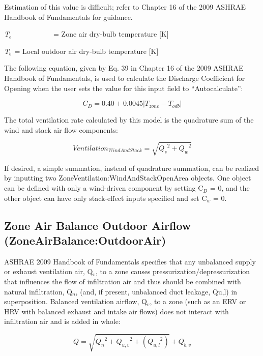 Estimation of this value is difficult; refer to Chapter 16 of the 2009 ASHRAE Handbook of Fundamentals for guidance.

\emph{T\(_{e}\)}~~~~~~~~~~~ = Zone air dry-bulb temperature {[}K{]}

\emph{T\(_{b}\)}\(_{ }\) = Local outdoor air dry-bulb temperature {[}K{]}

The following equation, given by Eq. 39 in Chapter 16 of the 2009 ASHRAE Handbook of Fundamentals, is used to calculate the Discharge Coefficient for Opening when the user sets the value for this input field to ``Autocalculate'':

\begin{equation}
{C_D} = 0.40 + 0.0045\left| {{T_{zone}} - {T_{odb}}} \right|
\end{equation}

The total ventilation rate calculated by this model is the quadrature sum of the wind and stack air flow components:

\begin{equation}
Ventilatio{n_{WindAndStack}} = \sqrt {{Q_s}^2 + {Q_w}^2}
\end{equation}

If desired, a simple summation, instead of quadrature summation, can be realized by inputting two ZoneVentilation:WindAndStackOpenArea objects. One object can be defined with only a wind-driven component by setting C\(_{D}\) = 0, and the other object can have only stack-effect inputs specified and set C\(_{w}\) = 0.

\subsection{Zone Air Balance Outdoor Airflow (ZoneAirBalance:OutdoorAir)}\label{zone-air-balance-outdoor-airflow-zoneairbalanceoutdoorair}

ASHRAE 2009 Handbook of Fundamentals specifies that any unbalanced supply or exhaust ventilation air, Q\(_{v}\), to a zone causes pressurization/depressurization that influences the flow of infiltration air and thus should be combined with natural infiltration, Q\(_{n}\), (and, if present, unbalanced duct leakage, Qu,l) in superposition. Balanced ventilation airflow, Q\(_{v}\), to a zone (such as an ERV or HRV with balanced exhaust and intake air flows) does not interact with infiltration air and is added in whole:

\begin{equation}
Q = \sqrt {{Q_n}^2 + {Q_{u,v}}^2 + ({Q_{u,l}}^2)}  + {Q_{b,v}}
\end{equation}


